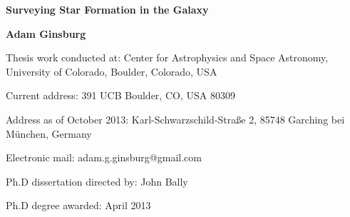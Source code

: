 
\textwidth 18cm
\textheight 23cm
\oddsidemargin -1cm
\topmargin 0cm
\parskip 0.15cm
\parindent 0pt
\small


\begin{center}


{\Large\bf{Surveying Star Formation in the Galaxy}}

\vspace*{0.5cm}

{\bf{ Adam Ginsburg }}

{Thesis work conducted at: Center for Astrophysics and Space Astronomy, University of Colorado, Boulder, Colorado, USA}

{Current address: 
391 UCB
Boulder, CO, USA 80309}

{Address as of October 2013:
Karl-Schwarzschild-Straße 2, 
85748 Garching bei München, Germany
}

{Electronic mail: adam.g.ginsburg@gmail.com}

{Ph.D dissertation directed by: John Bally}

{Ph.D degree awarded: April 2013}

\vspace*{0.8cm}

\end{center}

